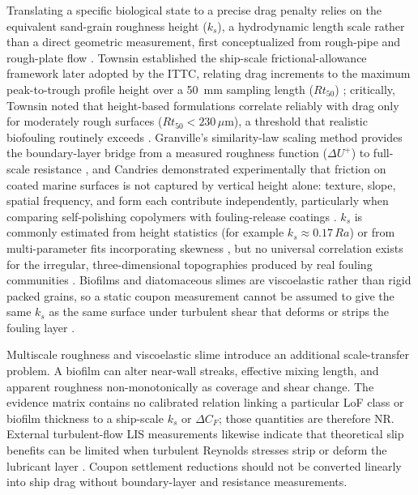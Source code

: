Translating a specific biological state to a precise drag penalty relies on the equivalent sand-grain roughness height ($k_s$), a hydrodynamic length scale rather than a direct geometric measurement, first conceptualized from rough-pipe and rough-plate flow \cite{nikuradse_1933,schlichting_1936}. Townsin established the ship-scale frictional-allowance framework later adopted by the ITTC, relating drag increments to the maximum peak-to-trough profile height over a 50~mm sampling length ($Rt_{50}$) \cite{townsin_mosaad_1985,townsin_1991,townsin_2003}; critically, Townsin noted that height-based formulations correlate reliably with drag only for moderately rough surfaces ($Rt_{50}<230\,\mu\text{m}$), a threshold that realistic biofouling routinely exceeds \cite{townsin_2003}. Granville's similarity-law scaling method provides the boundary-layer bridge from a measured roughness function ($\Delta U^+$) to full-scale resistance \cite{granville_1958,granville_1987}, and Candries demonstrated experimentally that friction on coated marine surfaces is not captured by vertical height alone: texture, slope, spatial frequency, and form each contribute independently, particularly when comparing self-polishing copolymers with fouling-release coatings \cite{candries_2001_thesis,candries_anderson_atlar_2001,candries_atlar_2005}. $k_s$ is commonly estimated from height statistics (for example $k_s\approx0.17\,Ra$) or from multi-parameter fits incorporating skewness \cite{schultz2007roughness,flack_schultz_2010}, but no universal correlation exists for the irregular, three-dimensional topographies produced by real fouling communities \cite{speranza_modelling_2019}. Biofilms and diatomaceous slimes are viscoelastic rather than rigid packed grains, so a static coupon measurement cannot be assumed to give the same $k_s$ as the same surface under turbulent shear that deforms or strips the fouling layer \cite{snowdon_surface_2023}.

Multiscale roughness and viscoelastic slime introduce an additional scale-transfer problem. A biofilm can alter near-wall streaks, effective mixing length, and apparent roughness non-monotonically as coverage and shear change. The evidence matrix contains no calibrated relation linking a particular LoF class or biofilm thickness to a ship-scale $k_s$ or $\Delta C_F$; those quantities are therefore NR. External turbulent-flow LIS measurements likewise indicate that theoretical slip benefits can be limited when turbulent Reynolds stresses strip or deform the lubricant layer \cite{arxiv170609934}. Coupon settlement reductions should not be converted linearly into ship drag without boundary-layer and resistance measurements.

